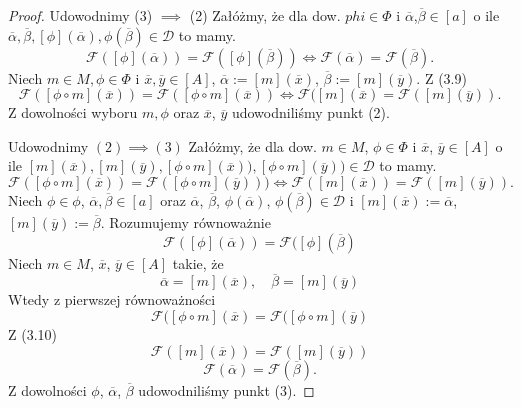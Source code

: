 \documentclass[12pt,a4paper]{report}
\newcommand{\domkniecie}[1]{\left\lbrack{#1}\right\rbrack}
\begin{document}
\begin{proof}
Udowodnimy (3) $\implies$ (2)
Załóżmy, że dla dow. $phi \in \Phi$ i $\overline{\alpha}$,$ \overline{\beta} \in \domkniecie{a}$ o ile $\overline{\alpha}, \overline{\beta}, \domkniecie{\phi}(\overline{\alpha}), \phi(\overline{\beta}) \in \mathcal{D}$ to mamy.
\begin{equation}
\mathcal{F}(\domkniecie{\phi}(\overline{\alpha}))=\mathcal{F}(\domkniecie{\phi}(\overline{\beta})) \iff \mathcal{F}(\overline{\alpha})=\mathcal{F}(\overline{\beta}).
\end{equation}
Niech $m\in M, \phi\in \Phi$ i $\overline{x}, \overline{y} \in \domkniecie{A}$, $\overline{\alpha}:=\domkniecie{m}(\overline{x})$, $\overline{\beta}:=\domkniecie{m}(\overline{y})$. Z (3.9)
$$
\mathcal{F}(\domkniecie{\phi\circ m}(\overline{x}))=\mathcal{F}(\domkniecie{\phi\circ m}(\overline{x})) \iff \mathcal{F}(\domkniecie{m} (\overline{x})=\mathcal{F}(\domkniecie{m}(\overline{y})).
$$
Z dowolności wyboru $m, \phi$ oraz $\overline{x}$, $\overline{y}$ udowodniliśmy punkt (2).

Udowodnimy $(2) \implies (3)$
Załóżmy, że dla dow. $m \in M$, $\phi \in \Phi$ i $\overline{x}$, $\overline{y} \in \domkniecie{A}$ o ile $\domkniecie{m}(\overline{x}), \domkniecie{
m}(\overline{y}), \domkniecie{\phi\circ m}(\overline{x})), \domkniecie{\phi\circ m}(\overline{y})) \in \mathcal{D}$ to mamy.
\begin{equation}
\mathcal{F}(\domkniecie{\phi \circ m}(\overline{x}))=\mathcal{F}(\domkniecie{\phi \circ m}(\overline{y}))) \iff \mathcal{F}(\domkniecie{m}(\overline{x}))=\mathcal{F}(\domkniecie{m}(\overline{y})).
\end{equation}
Niech $\phi \in \phi$, $\overline{\alpha}, \overline{\beta} \in \domkniecie{a}$ oraz $\overline{\alpha}$, $\overline{\beta}$, $\phi(\overline{\alpha})$, $\phi(\overline{\beta}) \in \mathcal{D}$ i $\domkniecie{m}(\overline{x}):=\overline{\alpha}$,  $\domkniecie{m}(\overline{y}):=\overline{\beta}$. 
Rozumujemy równoważnie
$$
\mathcal{F}(\domkniecie{\phi}(\overline{\alpha}))=\mathcal{F}(\domkniecie{\phi}(\overline{\beta})
$$
Niech $m \in M$, $\overline{x}$, $\overline{y} \in \domkniecie{A}$ takie, że
$$
\overline{\alpha}=\domkniecie{m}(\overline{x}), \quad \overline{\beta}=\domkniecie{m}(\overline{y})
$$
Wtedy z pierwszej równoważności
$$
\mathcal{F}(\domkniecie{\phi \circ m}(\overline{x})=\mathcal{F}(\domkniecie{\phi \circ m}(\overline{y})
$$
Z (3.10)
$$
\mathcal{F}(\domkniecie{m}(\overline{x}))=\mathcal{F}(\domkniecie{m}(\overline{y})) 
$$
$$
\mathcal{F}(\overline{\alpha})=\mathcal{F}(\overline{\beta}).
$$
Z dowolności $\phi$, $\overline{\alpha}$, $\overline{\beta}$ udowodniliśmy punkt (3).
\end{proof}
\end{document}
